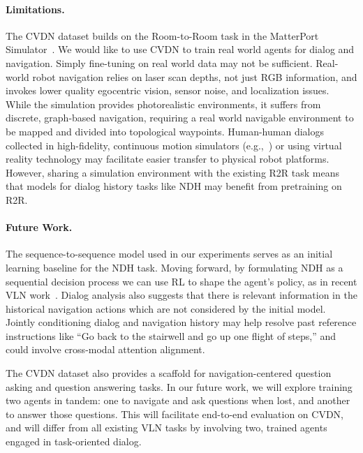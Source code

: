 \documentclass{article}
\newcommand{\dataset}{CVDN}
\newcommand{\task}{NDH}
\begin{document}
\paragraph{Limitations.}
The \dataset{} dataset builds on the Room-to-Room task in the MatterPort Simulator~\cite{anderson:cvpr18}.
We would like to use \dataset{} to train real world agents for dialog and navigation.
Simply fine-tuning on real world data may not be sufficient.
Real-world robot navigation relies on laser scan depths, not just RGB information, and invokes lower quality egocentric vision, sensor noise, and localization issues.
While the simulation provides photorealistic environments, it suffers from discrete, graph-based navigation, requiring a real world navigable environment to be mapped and divided into topological waypoints.
Human-human dialogs collected in high-fidelity, continuous motion simulators (e.g.,~\cite{ai2thor}) or using virtual reality technology may facilitate easier transfer to physical robot platforms.
However, sharing a simulation environment with the existing R2R task means that models for dialog history tasks like \task{} may benefit from pretraining on R2R.

\paragraph{Future Work.}
The sequence-to-sequence model used in our experiments serves as an initial learning baseline for the \task{} task.
Moving forward, by formulating \task{} as a sequential decision process we can use RL to shape the agent's policy, as in recent VLN work~\cite{tan:naacl19}.
Dialog analysis also suggests that there is relevant information in the historical navigation actions which are not considered by the initial model.
Jointly conditioning dialog and navigation history may help resolve past reference instructions like ``Go back to the stairwell and go up one flight of steps,'' and could involve cross-modal attention alignment.

The \dataset{} dataset also provides a scaffold for navigation-centered question asking and question answering tasks.
In our future work, we will explore training two agents in tandem: one to navigate and ask questions when lost, and another to answer those questions.
This will facilitate end-to-end evaluation on \dataset{}, and will differ from all existing VLN tasks by involving two, trained agents engaged in task-oriented dialog.
 
\clearpage
{}
\end{document}
